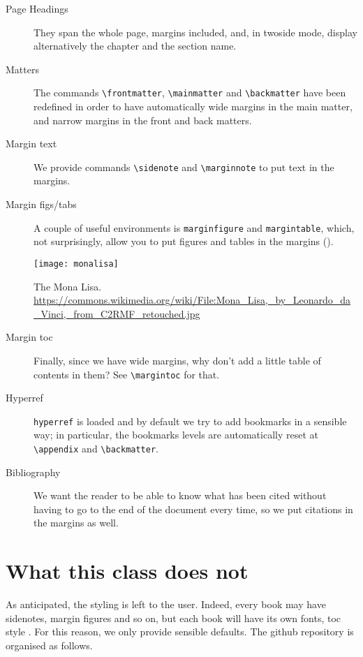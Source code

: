\begin{description}
	\item[Page Headings] They span the whole page, margins included, 
		and, in twoside mode, display alternatively the chapter and the 
		section name.
	\item[Matters] The commands \verb|\frontmatter|, \verb|\mainmatter| 
		and \verb|\backmatter| have been redefined in order to have 
		automatically wide margins in the main matter, and narrow 
		margins in the front and back matters.
	\item[Margin text] We provide commands \verb|\sidenote| and 
		\verb|\marginnote| to put text in the 
		margins.
	\item[Margin figs/tabs] A couple of useful environments is 
		\verb|marginfigure| and \verb|margintable|, which, not 
		surprisingly, allow you to put figures and tables in the margins 
		(\cfr {}).
		\begin{marginfigure}
			\texttt{[image: monalisa]}
			\caption[The Mona Lisa]{The Mona Lisa.\\
				\url{https://commons.wikimedia.org/wiki/File:Mona_Lisa,_by_Leonardo_da_Vinci,_from_C2RMF_retouched.jpg}}
		\end{marginfigure}
	\item[Margin toc] Finally, since we have wide margins, why don't add 
		a little table of contents in them? See \verb|\margintoc| for 
		that.
	\item[Hyperref] \verb|hyperref| is loaded and by default we try to 
		add bookmarks in a sensible way; in particular, the bookmarks 
		levels are automatically reset at \verb|\appendix| and 
		\verb|\backmatter|.
	\item[Bibliography] We want the reader to be able to know what has 
		been cited without having to go to the end of the document every 
		time, so we put citations in the margins as well.
\end{description}

\section{What this class does not}

As anticipated, the styling is left to the user. Indeed, every book may 
have sidenotes, margin figures and so on, but each book will have its 
own fonts, toc style \etcetera. For this reason, we only provide 
sensible defaults. The github repository is organised as follows.

